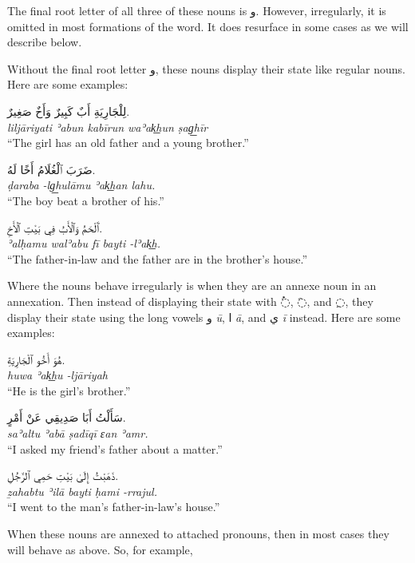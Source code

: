 \documentclass[
  10pt,
]{book}
\begin{document}
The final root letter of all three of these nouns is \foreignlanguage{arabic}{و}. However, irregularly, it is omitted in most formations of the word. It does resurface in some cases as we will describe below.

Without the final root letter \foreignlanguage{arabic}{و}, these nouns display their state like regular nouns. Here are some examples:

\foreignlanguage{arabic}{لِلْجَارِيَةِ أَبٌ کَبِيرٌ وَأَخٌ صَغِيرٌ.}\\
\emph{liljāriyati ʾabun kabīrun waʾak͟hun ṣag͟hīr}\\
\enquote{The girl has an old father and a young brother.}

\foreignlanguage{arabic}{ضَرَبَ ٱلْغُلَامُ أَخًا لَهُ.}\\
\emph{ḍaraba -lg͟hulāmu ʾak͟han lahu.}\\
\enquote{The boy beat a brother of his.}

\foreignlanguage{arabic}{ٱَلْحَمُ وَٱلْأَبُ فِي بَيْتِ ٱلْأَخِ.}\\
\emph{ʾalḥamu walʾabu fī bayti -lʾak͟h.}\\
\enquote{The father-in-law and the father are in the brother's house.}

Where the nouns behave irregularly is when they are an annexe noun in an annexation. Then instead of displaying their state with \foreignlanguage{arabic}{◌ُ}, \foreignlanguage{arabic}{◌َ}, and \foreignlanguage{arabic}{◌ِ}, they display their state using the long vowels \foreignlanguage{arabic}{و} \emph{ū}, \foreignlanguage{arabic}{ا} \emph{ā}, and \foreignlanguage{arabic}{ي} \emph{ī} instead. Here are some examples:

\foreignlanguage{arabic}{هُوَ أَخُو ٱلْجَارِيَةِ.}\\
\emph{huwa ʾak͟hu -ljāriyah}\\
\enquote{He is the girl's brother.}

\foreignlanguage{arabic}{سَأَلْتُ أَبَا صَدِيقِي عَنْ أَمْرٍ.}\\
\emph{saʾaltu ʾabā ṣadīqī ɛan ʾamr.}\\
\enquote{I asked my friend's father about a matter.}

\foreignlanguage{arabic}{ذَهَبْتُ إِلَىٰ بَيْتِ حَمِي ٱلرَّجُلِ.}\\
\emph{ẕahabtu ʾilā bayti ḥami -rrajul.}\\
\enquote{I went to the man's father-in-law's house.}

When these nouns are annexed to attached pronouns, then in most cases they will behave as above. So, for example,
\end{document}

